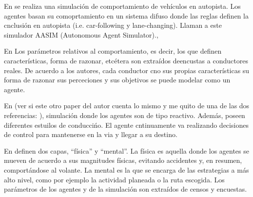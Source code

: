En \cite{Das} se realiza una simulación de comportamiento de vehículos en autopista. Los agentes basan su comoprtamiento en un sistema difuso donde las reglas definen la cnclusión en autopista (i.e. car-following y lane-changing). Llaman a este simulador AASIM (Autonomous Agent Simulator).,

En \cite{Dia2002} Los parámetros relativos al comportamiento, es decir, los que definen características, forma de razonar, etcétera son extraídos deencustas a conductores reales. De acuerdo a los autores, cada conductor cno sus propias características su forma de razonar sus perceciones y sus objetivos se puede modelar como un agente.

En \cite{Ehlert2001} (ver si este otro paper del autor cuenta lo mismo y me quito de una de las dos referencias: \cite{Ehlert2001-2}), simulación donde los agentes son de tipo reactivo. Además, poseen diferentes estuilos de conduccińo. El agente cntinuamente va realizando decisiones de control para mantenerse en la via y llegar a su destino.

En \cite{} definen dos capas, \enquote{física} y \enquote{mental}. La física es aquella donde los agentes se mueven de acuerdo a sus magnitudes físicas, evitando accidentes y, en resumen, comportándose al volante. La mental es la que se encarga de las estrategias a más alto nivel, como por ejemplo la actividad planeada o la ruta escogida. Los parámetros de los agentes y de la simulación son extraídos de censos y encuestas.